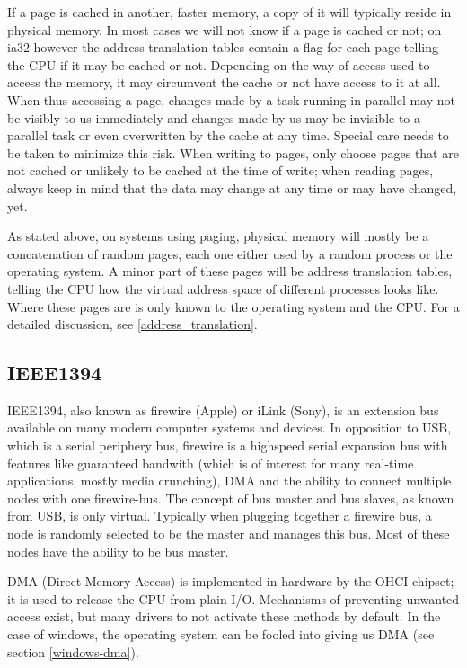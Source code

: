 If a page is cached in another, faster memory, a copy of it will typically
reside in physical memory. In most cases we will not know if a page is cached
or not; on ia32 however the address translation tables contain a flag for each
page telling the CPU if it may be cached or not. Depending on the way of access
used to access the memory, it may circumvent the cache or not have access to it
at all. When thus accessing a page, changes made by a task running in parallel
may not be visibly to us immediately and changes made by us may be invisible to
a parallel task or even overwritten by the cache at any time. Special care
needs to be taken to minimize this risk. When writing to pages, only choose
pages that are not cached or unlikely to be cached at the time of write; when
reading pages, always keep in mind that the data may change at any time or may
have changed, yet.

As stated above, on systems using paging, physical memory will mostly be a
concatenation of random pages, each one either used by a random process or the
operating system. A minor part of these pages will be address translation
tables, telling the CPU how the virtual address space of different processes
looks like. Where these pages are is only known to the operating system and the
CPU. For a detailed discussion, see \ref{address_translation}.



\subsection{IEEE1394}

IEEE1394, also known as firewire (Apple) or iLink (Sony), is an extension bus
available on many modern computer systems and devices.  In opposition to USB,
which is a serial periphery bus, firewire is a highspeed serial expansion bus
with features like guaranteed bandwith (which is of interest for many real-time
applications, mostly media crunching), DMA and the ability to connect multiple
nodes with one firewire-bus. The concept of bus master and bus slaves, as known
from USB, is only virtual. Typically when plugging together a firewire bus, a
node is randomly selected to be the master and manages this bus. Most of these
nodes have the ability to be bus master.

DMA (Direct Memory Access) is implemented in hardware by the OHCI chipset; it
is used to release the CPU from plain I/O. Mechanisms of preventing unwanted
access exist, but many drivers to not activate these methods by default. In the
case of windows, the operating system can be fooled into giving us DMA (see
section \ref{windows-dma}).

